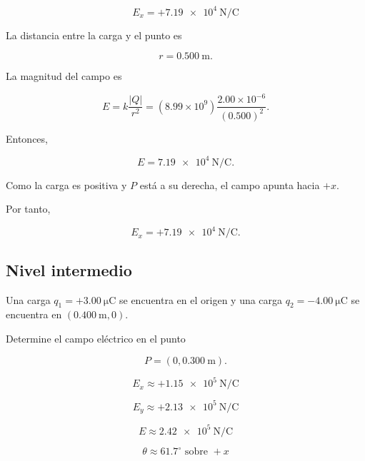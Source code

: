 \begin{respuesta}

\[
\boxed{E_x=+\SI{7.19e4}{\newton\per\coulomb}}
\]

\end{respuesta}

\begin{explicacion}

La distancia entre la carga y el punto es

\[
r=\SI{0.500}{\metre}.
\]

La magnitud del campo es

\[
E=k\frac{|Q|}{r^2}
=(8.99\times10^9)\frac{2.00\times10^{-6}}{(0.500)^2}.
\]

Entonces,

\[
E=\SI{7.19e4}{\newton\per\coulomb}.
\]

Como la carga es positiva y \(P\) está a su derecha, el campo apunta hacia \(+x\).

Por tanto,

\[
\boxed{E_x=+\SI{7.19e4}{\newton\per\coulomb}}.
\]

\end{explicacion}


\subsection{Nivel intermedio}

\begin{ejercicio}

Una carga \(q_1=+\SI{3.00}{\micro\coulomb}\) se encuentra en el origen y una carga
\(q_2=-\SI{4.00}{\micro\coulomb}\) se encuentra en
\((\SI{0.400}{\metre},0)\).

Determine el campo eléctrico en el punto

\[
P=(0,\SI{0.300}{\metre}).
\]

\end{ejercicio}

\begin{respuesta}

\[
\boxed{E_x\approx+\SI{1.15e5}{\newton\per\coulomb}}
\]

\[
\boxed{E_y\approx+\SI{2.13e5}{\newton\per\coulomb}}
\]

\[
\boxed{E\approx\SI{2.42e5}{\newton\per\coulomb}}
\]

\[
\boxed{\theta\approx61.7^\circ\text{ sobre }+x}
\]

\end{respuesta}


